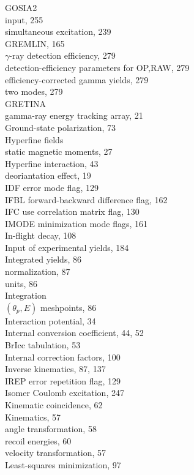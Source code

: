 \documentclass[10pt]{article}
\begin{document}
GOSIA2\\
input, 255\\
simultaneous excitation, 239\\
GREMLIN, 165\\
$\gamma$-ray detection efficiency, 279\\
detection-efficiency parameters for OP,RAW, 279\\
efficiency-corrected gamma yields, 279\\
two modes, 279\\
GRETINA\\
gamma-ray energy tracking array, 21\\
Ground-state polarization, 73\\
Hyperfine fields\\
static magnetic moments, 27\\
Hyperfine interaction, 43\\
deoriantation effect, 19\\
IDF error mode flag, 129\\
IFBL forward-backward difference flag, 162\\
IFC use correlation matrix flag, 130\\
IMODE minimization mode flags, 161\\
In-flight decay, 108\\
Input of experimental yields, 184\\
Integrated yields, 86\\
normalization, 87\\
units, 86\\
Integration\\
$\left(\theta_{p}, E\right)$ meshpoints, 86\\
Interaction potential, 34\\
Internal conversion coefficient, 44, 52\\
BrIcc tabulation, 53\\
Internal correction factors, 100\\
Inverse kinematics, 87, 137\\
IREP error repetition flag, 129\\
Isomer Coulomb excitation, 247\\
Kinematic coincidence, 62\\
Kinematics, 57\\
angle transformation, 58\\
recoil energies, 60\\
velocity transformation, 57\\
Least-squares minimization, 97\\
\end{document}
